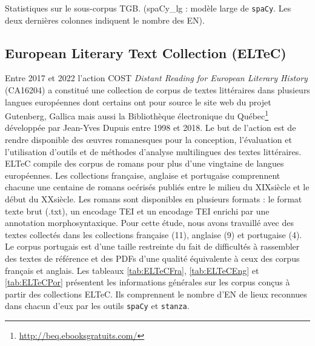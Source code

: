 
\begin{table}[h!]
    \centering
    \small
    
    \caption{Statistiques sur le sous-corpus TGB. (spaCy\_lg : modèle large de \texttt{spaCy}. Les deux dernières colonnes indiquent le nombre des EN).}
    \label{tab:TGBFra}
\end{table}



\subsection{European Literary Text Collection (ELTeC)}

Entre 2017 et 2022 l'action COST \textit{Distant Reading for European Literary History} (CA16204) a constitué une collection de corpus de textes littéraires dans plusieurs langues européennes dont certains ont pour source le site web du projet Gutenberg, Gallica mais aussi la Bibliothèque électronique du Québec\footnote{\url{http://beq.ebooksgratuits.com/}} développée par Jean-Yves Dupuis entre 1998 et 2018. Le but de l'action est de rendre disponible des œuvres romanesques pour la conception, l'évaluation et l'utilisation d'outils et de méthodes d'analyse multilingues des textes littéraires. ELTeC compile des corpus de romans pour plus d'une vingtaine de langues européennes. Les collections française, anglaise et portugaise comprennent chacune une centaine de romans océrisés publiés entre le milieu du XIX\ieme{}siècle et le début du XX\ieme{}siècle. Les romans sont disponibles en plusieurs formats : le format texte brut (.txt), un encodage TEI et un encodage TEI enrichi par une annotation morphosyntaxique.
Pour cette étude, nous avons travaillé avec des textes collectés dans les collections française (11), anglaise (9) et portugaise (4). Le corpus portugais est d'une taille restreinte du fait de difficultés à rassembler des textes de référence et des PDFs d'une qualité équivalente à ceux des corpus français et anglais. Les tableaux \ref{tab:ELTeCFra}, \ref{tab:ELTeCEng} et \ref{tab:ELTeCPor} présentent les informations générales sur les corpus conçus à partir des collections ELTeC. Ils comprennent le nombre d'EN de lieux reconnues dans chacun d'eux par les outils \texttt{spaCy} et \texttt{stanza}.

